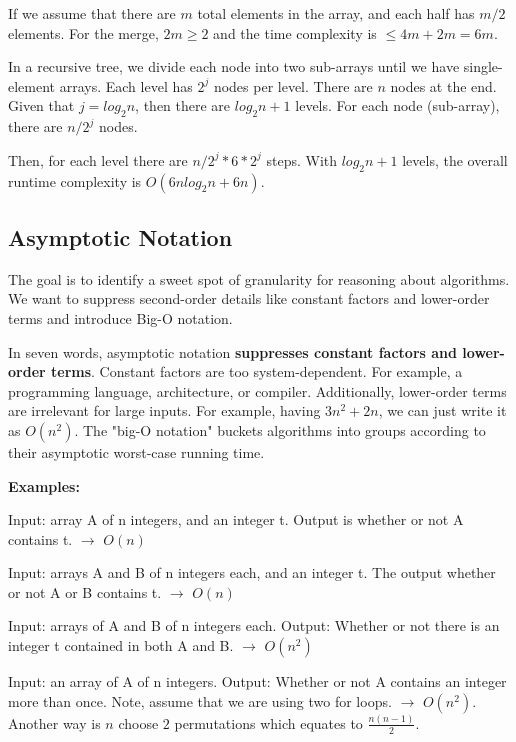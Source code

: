 \documentclass[11pt]{article}
\begin{document}
If we assume that there are $m$ total elements in the array, and each half has $m/2$ elements. For the merge, $2m \geq 2$ and the time complexity is $\leq 4m + 2m = 6m$.

In a recursive tree, we divide each node into two sub-arrays until we have single-element arrays. Each level has $2^j$ nodes per level. There are $n$ nodes at the end. Given that $j = log_2n$, then there are $log_2n+1$ levels. For each node (sub-array), there are $n/2^j$ nodes.

Then, for each level there are $n/2^j * 6 * 2^j$ steps. With $log_2n+1$ levels, the overall runtime complexity is $O(6nlog_2n + 6n)$.

\vspace{11pt}
\subsection{Asymptotic Notation}
\vspace{11pt}

The goal is to identify a sweet spot of granularity for reasoning about algorithms. We want to suppress second-order details like constant factors and lower-order terms and introduce Big-O notation.

In seven words, asymptotic notation \textbf{suppresses constant factors and lower-order terms}. Constant factors are too system-dependent. For example, a programming language, architecture, or compiler. Additionally, lower-order terms are irrelevant for large inputs. For example, having $3n^2+2n$, we can just write it as $O(n^2)$. The "big-O notation" buckets algorithms into groups according to their asymptotic worst-case running time.

\vspace{11pt}
\textbf{Examples:}

Input: array A of n integers, and an integer t. Output is whether or not A contains t. $\to$ $O(n)$

Input: arrays A and B of n integers each, and an integer t. The output whether or not A or B contains t. $\to$ $O(n)$

Input: arrays of A and B of n integers each. Output: Whether or not there is an integer t contained in both A and B. $\to$ $O(n^2)$

Input: an array of A of n integers. Output: Whether or not A contains an integer more than once. Note, assume that we are using two for loops. $\to$ $O(n^2)$. Another way is $n$ choose $2$ permutations which equates to $\frac{n(n-1)}{2}$.
\end{document}
